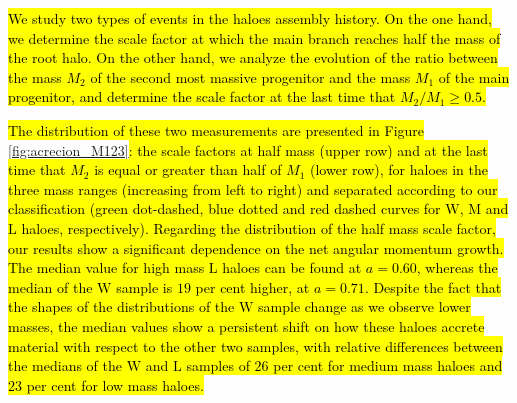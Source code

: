 \documentclass[fleqn,usenatbib]{mnras}
\newcommand{\Wh}{\mathrm{W}}
\newcommand{\Lh}{\mathrm{L}}
\newcommand{\Mh}{\mathrm{M}}
\begin{document}
\hl{We study two types of events in the haloes assembly history. On the one hand, we determine the scale factor at which the main branch reaches half the mass of the root halo. On the other hand, we analyze the evolution of the ratio between the mass $M_2$ of the second most massive progenitor and the mass $M_1$ of the main progenitor, and determine the scale factor at the last time that $M_2/M_1\geqslant 0.5$.}

\hl{The distribution of these two measurements are presented in Figure }\ref{fig:acrecion_M123}\hl{: the scale factors at half mass (upper row) and at the last time that $M_2$ is equal or greater than half of $M_1$ (lower row), for haloes in the three mass ranges (increasing from left to right) and separated according to our classification (green dot-dashed, blue dotted and red dashed curves for $\Wh$, $\Mh$ and $\Lh$ haloes, respectively). 
Regarding the distribution of the half mass scale factor, our results show a significant dependence on the net angular momentum growth. The median value for high mass $\Lh$ haloes can be found at $a=0.60$, whereas the median of the $\Wh$ sample is $19$ per cent higher, at $a=0.71$. Despite the fact that the shapes of the distributions of the $\Wh$ sample change as we observe lower masses, the median values show a persistent shift on how these haloes accrete material with respect to the other two samples, with relative differences between the medians of the $\Wh$ and $\Lh$ samples of $26$ per cent for medium mass haloes and $23$ per cent for low mass haloes.}
\end{document}
